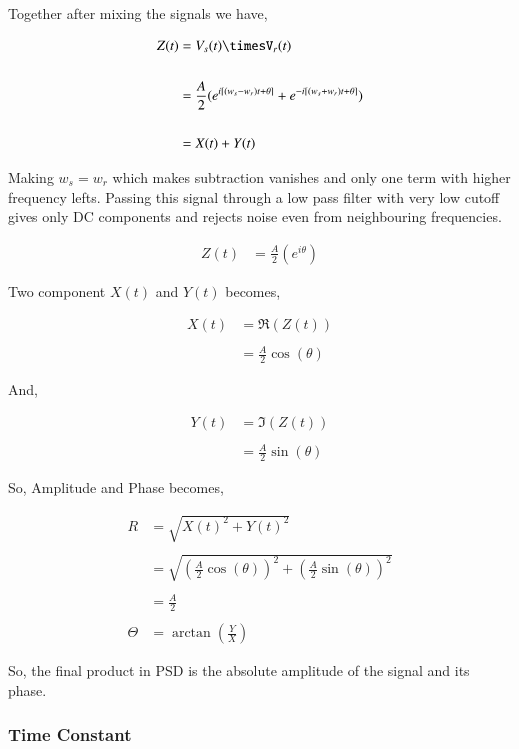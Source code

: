 Together after mixing the signals we have,

\begin{align*}
Z(t) & = V_s(t)\timesV_r(t)\\
\\
& = \frac{A}{2}(e^{i\left[ (w_s-w_r)t+\theta \right]}+e^{-i\left[ (w_s+w_r)t+\theta \right]})\\
\\
& = X(t)+Y(t)
\end{align*}

Making $w_s=w_r$ which makes subtraction vanishes and only one term with higher frequency lefts. Passing this signal through a low pass filter with very low cutoff gives only DC components and rejects noise even from neighbouring frequencies.


\begin{align*}
Z(t) & = \frac{A}{2}(e^{i \theta})
\end{align*}

Two component $X(t)$ and $Y(t)$ becomes,

\begin{align*}
X(t) & =\Re(Z(t))\\
\\
& =  \frac{A}{2}\cos(\theta)
\end{align*}

And,

\begin{align*}
Y(t) & = \Im(Z(t))\\
\\
& =  \frac{A}{2}\sin(\theta)
\end{align*}

So, Amplitude and Phase becomes, 

\begin{align*}
R & = \sqrt{X(t)^2+Y(t)^2}\\
\\
& =  \sqrt{(\frac{A}{2}\cos(\theta))^2+(\frac{A}{2}\sin(\theta))^2}\\
\\
& = \frac{A}{2}\\
\\
\Theta & = \arctan(\frac{Y}{X})
\end{align*}

So, the final product in PSD is the absolute amplitude of the signal and its phase. 

\subsubsection{Time Constant }


